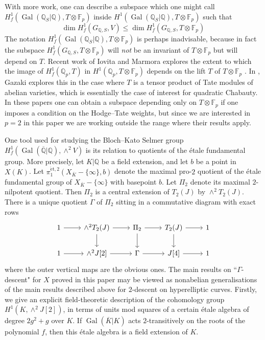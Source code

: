 \documentclass[11pt]{amsart}
\def\Q{\mathbb Q}
\def\F{\mathbb F}
\theoremstyle{plain}
\theoremstyle{definition}
\DeclareMathOperator{\Gal}{Gal}
\newcommand{\et}{\mathrm{\acute{e}t}}
\begin{document}
With more work, one can describe a subspace which one might call $H^1 _f (\Gal (\Q _S |\Q ),T\otimes \F _p )$ inside $H^1 (\Gal (\Q _S |\Q ),T\otimes \F _p )$ such that
\[
\dim H^1 _f (G_{\Q ,S},V)\leq \dim H^1 _ f (G_{\Q ,S},T\otimes \F _p )
\]
The notation $H^1 _f (\Gal (\Q _S |\Q ),T\otimes \F _p )$ is perhaps inadvisable, because in fact the subspace $H^1 _f (G_{\Q ,S},T\otimes \F _p )$ will \textit{not} be an invariant of $T\otimes \F _p $ but will depend on $T$. Recent work of Iovita and Marmora explores the extent to which the image of $H^1 _f (\Q _p ,T)$ in $H^1 (\Q _p ,T\otimes \F _p )$ depends on the lift $T$ of $T\otimes \F _p $ \cite{IM15}. In \cite{gazaki}, Gazaki explores this in the case where $T$ is a tensor product of Tate modules of abelian varieties, which is essentially the case of interest for quadratic Chabauty. In these papers one can obtain a subspace depending only on $T\otimes \F _p $ if one imposes a condition on the Hodge--Tate weights, but since we are interested in $p=2$ in this paper we are working outside the range where their results apply.

One tool used for studying the Bloch--Kato Selmer group $H^1 _f (\Gal (\overline{\Q }|\Q ),\wedge ^2 V)$ is its relation to quotients of the \'etale fundamental group. More precisely, let $K|\Q $ be a field extension, and let $b$ be a point in $X(K)$. Let $\pi _1 ^{\et ,2}(X_{\overline{K}}-\{ \infty \} ,b)$ denote the maximal pro-$2$ quotient of the \'etale fundamental group of $X_{\overline{K}}-\{ \infty \} $ with basepoint $b$. Let $\Pi _2 $ denote its maximal $2$-nilpotent quotient. Then $\Pi _2 $ is a central extension of $T_2 (J)$ by $\wedge ^2 T_2 (J)$.
There is a unique quotient $\Gamma $ of $\Pi _2 $ sitting in a commutative diagram with exact rows
\begin{equation}\label{eqn:gammabar}
\begin{tikzcd}
1 \arrow[r] & \wedge ^2 T_2 (J) \arrow[d] \arrow[r] & \Pi _2 \arrow[d] \arrow[r] & T_2 (J) \arrow[d] \arrow[r] & 1 \\
1 \arrow[r] & \wedge ^2 J[2] \arrow[r]           & \Gamma  \arrow[r]           & J[4] \arrow[r]           & 1
\end{tikzcd}
\end{equation}
where the outer vertical maps are the obvious ones. The main results on ``$\Gamma$-descent" for $X$ proved in this paper may be viewed as nonabelian generalisations of the main results described above for $2$-descent on hyperelliptic curves. Firstly, we give an explicit field-theoretic description of the cohomology group $H^1 (K,\wedge ^2 J[2])$, in terms of units mod squares of a certain \'etale algebra of degree $2g^2 +g$ over $K$. If $\Gal (\overline{K}|K)$ acts $2$-transitively on the roots of the polynomial $f$, then this \'etale algebra is a field extension of $K$.
\end{document}
